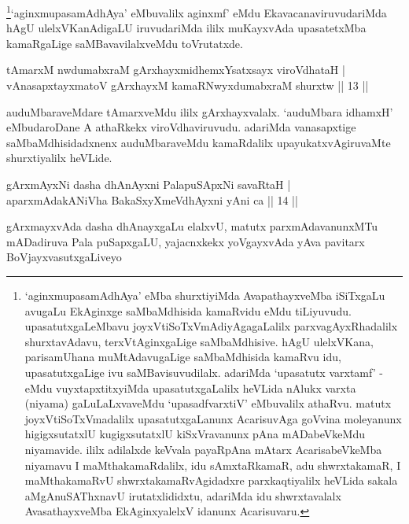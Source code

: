 \begin{artha}
\footnote{`aginxmupasamAdhAya' eMba shurxtiyiMda AvapathayxveMba iSiTxgaLu avugaLu EkAginxge \-saMbaMdhisida kamaRvidu eMdu tiLiyuvudu. upasatutxgaLeMbavu joyxVtiSoTxVmAdiyAga\-gaLalilx parxvagAyxRhadalilx shurxtavAdavu, terxVtAginxgaLige saMbaMdhisive. hAgU ulelxVKana, parisamUhana \-muMtAdavugaLige saMbaMdhisida kamaRvu idu, upasatutxgaLige ivu saMBavisuvudilalx. adariMda `upasatutx varxtamf' - eMdu vuyxtapxtitxyiMda upasatutxgaLalilx heVLida nAlukx varxta (niyama) gaLuLaLxvaveMdu `upasadfvarxtiV' eMbuvalilx athaRvu. matutx joyxVtiSoTxVmadalilx upa\-satutxgaLanunx AcarisuvAga goVvina moleyanunx higigxsutatxlU kugigxsutatxlU kiSxVravanunx pAna mADabeVkeMdu niyamavide. ililx adilalxde keVvala payaRpAna mAtarx AcarisabeVkeMba niyamavu I maMthakamaRdalilx, idu sAmxtaRkamaR, adu shwrxtakamaR, I maMthakamaRvU shwrxtakamaRvAgidadxre parxkaqtiyalilx heVLida sakala aMgAnuSAThxnavU irutatxlididxtu, adariMda idu shwrxtavalalx AvasathayxveMba EkAginxyalelxV idanunx Acarisuvaru.}`aginxmupasamAdhAya' eMbuvalilx aginxmf' eMdu Ekavacanaviruvuda\-riMda hAgU ulelxVKanAdigaLU iruvudariMda ililx muKayxvAda upasatetxMba kamaRgaLige saMBavavilalxveMdu toVrutatxde.
\end{artha}


\begin{shl}
tAmarxM nwdumabxraM gArxhayxmidhemxYsatxsayx viroVdhataH | \\
vAnasapxtayxmatoV gArxhayxM kamaRNwyxdumabxraM shurxtw \hfill|| 13 || 
\end{shl}

\begin{artha}
auduMbaraveMdare tAmarxveMdu ililx gArxhayxvalalx. `auduMbara idhamxH' eMbuda\-roDane A athaRkekx viroVdhaviruvudu. adariMda vanasapxtige saMbaMdhisidadxnenx auduMbaraveMdu kamaRdalilx upayukatxvAgiruvaMte shurxtiyalilx heVLide.
\end{artha}


\begin{shl}
gArxmAyxNi dasha dhAnAyxni PalapuSApxNi savaRtaH | \\
aparxmAdakANiVha BakaSxyXmeVdhAyxni yAni ca \hfill|| 14 || 
\end{shl}

\begin{artha}
gArxmayxvAda dasha dhAnayxgaLu elalxvU, matutx parxmAdavanunxMTu mADadiruva Pala puSapxgaLU, yajacnxkekx yoVgayxvAda yAva pavitarx BoVjayxvasutxgaLiveyo 
\end{artha}


